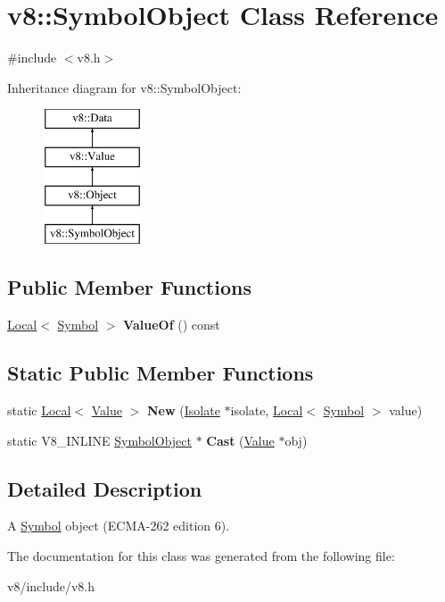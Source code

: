 \hypertarget{classv8_1_1SymbolObject}{}\section{v8\+:\+:Symbol\+Object Class Reference}
\label{classv8_1_1SymbolObject}


{\ttfamily \#include $<$v8.\+h$>$}

Inheritance diagram for v8\+:\+:Symbol\+Object\+:\begin{figure}[H]
\begin{center}
\leavevmode
\includegraphics[height=4.000000cm]{classv8_1_1SymbolObject}
\end{center}
\end{figure}
\subsection*{Public Member Functions}
\begin{DoxyCompactItemize}
\item 
\mbox{\label{classv8_1_1SymbolObject_a07e6a12e98b3787165addcafd9273aa7}} 
\mbox{\hyperlink{classv8_1_1Local}{Local}}$<$ \mbox{\hyperlink{classv8_1_1Symbol}{Symbol}} $>$ {\bfseries Value\+Of} () const
\end{DoxyCompactItemize}
\subsection*{Static Public Member Functions}
\begin{DoxyCompactItemize}
\item 
\mbox{\label{classv8_1_1SymbolObject_a3a3dc109d1207e4fe20671c17f5426c0}} 
static \mbox{\hyperlink{classv8_1_1Local}{Local}}$<$ \mbox{\hyperlink{classv8_1_1Value}{Value}} $>$ {\bfseries New} (\mbox{\hyperlink{classv8_1_1Isolate}{Isolate}} $\ast$isolate, \mbox{\hyperlink{classv8_1_1Local}{Local}}$<$ \mbox{\hyperlink{classv8_1_1Symbol}{Symbol}} $>$ value)
\item 
\mbox{\label{classv8_1_1SymbolObject_a03322931e62adfd4e5d184d15d5e4af9}} 
static V8\+\_\+\+I\+N\+L\+I\+NE \mbox{\hyperlink{classv8_1_1SymbolObject}{Symbol\+Object}} $\ast$ {\bfseries Cast} (\mbox{\hyperlink{classv8_1_1Value}{Value}} $\ast$obj)
\end{DoxyCompactItemize}


\subsection{Detailed Description}
A \mbox{\hyperlink{classv8_1_1Symbol}{Symbol}} object (E\+C\+M\+A-\/262 edition 6). 

The documentation for this class was generated from the following file\+:\begin{DoxyCompactItemize}
\item 
v8/include/v8.\+h\end{DoxyCompactItemize}
